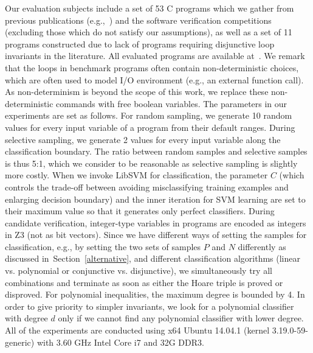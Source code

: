 Our evaluation subjects include a set of 53 C programs which we gather from previous publications (e.g.,~\cite{DBLP:conf/pldi/GulwaniSV08,sharma2012interpolants,gulavani2008automatically,jeannet2010interproc,isil2013inductive}) and the software verification competitions~\cite{Dirk:SVCOMP:2016} %
(excluding those which do not satisfy our assumptions), as well as a set of 11 programs constructed due to lack of programs requiring disjunctive loop invariants in the literature. All evaluated programs are available at~\cite{zilu:repo}. We remark that the loops in benchmark programs often contain non-deterministic choices, which are often used to model I/O environment (e.g., an external function call). As non-determinism is beyond the scope of this work, we replace these non-deterministic commands with free boolean variables. The parameters in our experiments are set as follows. For random sampling, we generate 10 random values for every input variable of a program from their default ranges. During selective sampling, we generate 2 values for every input variable along the classification boundary.
The ratio between random samples and selective samples is thus 5:1, which we consider to be reasonable as selective sampling is slightly more costly. When we invoke LibSVM for classification, the parameter $C$ (which controls the trade-off between avoiding misclassifying training examples and enlarging decision boundary) and the inner iteration for SVM learning are set to their maximum value so that it generates only perfect classifiers. During candidate verification, integer-type variables in programs are encoded as integers in Z3 (not as bit vectors). Since we have different ways of setting the samples for classification, e.g., by setting the two sets of samples $P$ and $N$ differently as discussed in~Section~\ref{alternative}, and different classification algorithms (linear vs. polynomial or conjunctive vs. disjunctive), we simultaneously try all combinations and terminate as soon as either the Hoare triple is proved or disproved. For polynomial inequalities, the maximum degree is bounded by 4. In order to give priority to simpler invariants, we look for a polynomial classifier with degree $d$ only if we cannot find any polynomial classifier with lower degree. All of the experiments are conducted using x64 Ubuntu 14.04.1 (kernel 3.19.0-59-generic) with 3.60 GHz Intel Core i7 and 32G DDR3.

